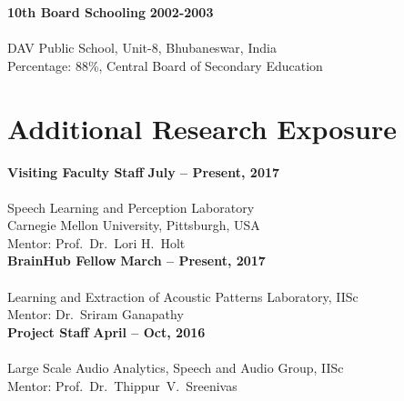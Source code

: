 \documentclass[line]{resume}
\begin{document}
{\begin{resume}
    \textbf{10th Board Schooling} \hfill \textbf{ 2002-2003}\vspace{-3mm}\\\vspace{-1mm}\\%
    DAV Public School, Unit-8, Bhubaneswar, India \vspace{0mm}\\%
    Percentage: 88\%, Central Board of Secondary Education
    \vspace{-1.5mm}
    \section{\mysidestyle Additional Research Exposure}
    \vspace{1mm}
    \textbf{Visiting Faculty Staff} \hfill \textbf{ July -- Present, 2017}\vspace{-3mm}\\\vspace{-1mm}\\%
    Speech Learning and Perception Laboratory\\
    Carnegie Mellon University, Pittsburgh, USA \vspace{0mm}\\%
    Mentor: Prof.~Dr.~Lori H.~Holt\vspace{-6mm}\\

    \textbf{BrainHub Fellow} \hfill \textbf{ March -- Present, 2017}\vspace{-3mm}\\\vspace{-1mm}\\%
    Learning and Extraction of Acoustic Patterns Laboratory, IISc\vspace{0mm}\\%
    Mentor: Dr.~Sriram Ganapathy\vspace{-6mm}\\

    \textbf{Project Staff} \hfill \textbf{ April -- Oct, 2016}\vspace{-3mm}\\\vspace{-1mm}\\%
    Large Scale Audio Analytics, Speech and Audio Group, IISc\\
    Mentor: Prof.~Dr.~Thippur~V.~Sreenivas\vspace{-6mm}\\


\end{resume}}
\end{document}
